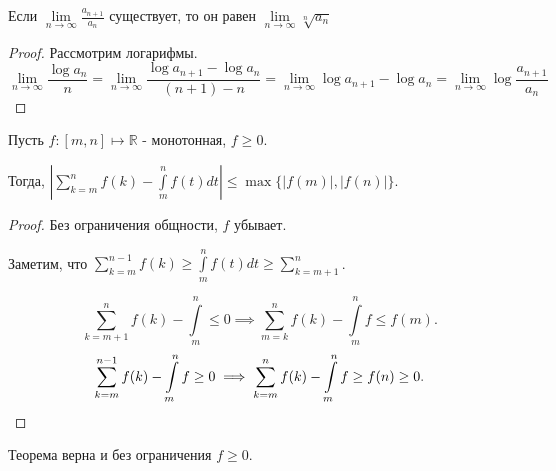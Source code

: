 \begin{theorem} \thmslashn

    Если $\lim\limits_{n \to \infty} \frac{a_{n+1}}{a_{n}}$ существует, то он равен $\lim\limits_{n \to \infty} \sqrt[n]{a_{n}} $
    \begin{proof} \thmslashn
    
        Рассмотрим логарифмы.
        \[ \lim\limits_{n \to \infty} \frac{\log a_{n}}{n} = \lim\limits_{n \to \infty} \frac{\log a_{n+1} - \log a_{n}}{(n+1) - n} = \lim\limits_{n \to \infty} \log a_{n+1} - \log a_{n} = \lim\limits_{n \to \infty} \log \frac{a_{n+1}}{a_{n}}\]
    \end{proof}
\end{theorem}
\begin{theorem} \thmslashn

    Пусть $f : [m, n] \mapsto \mathbb{R}$ - монотонная, $f \ge 0$.

    Тогда, $\left|\sum\limits_{k=m}^{n} f(k) - \int\limits_{m}^{n} f(t)dt\right| \le\max \{|f(m)|, |f(n)|\} $.

    \begin{proof} \thmslashn
        Без ограничения общности, $f$ убывает.
    
        Заметим, что $\sum\limits_{k=m}^{n-1} f(k) \ge \int\limits_{m}^{n} f(t)dt \ge \sum\limits_{k=m+1}^{n}$.

        \[ \sum\limits_{k=m+1}^{n} f(k) - \int\limits_{m}^{n} \le  0 \implies \sum\limits_{m=k}^{n} f(k) - \int\limits_{m}^{n} f \le f(m)   .\]
        \[ \sum\limits_{k=m}^{n-1} f(k) - \int\limits_{m}^{n} f \ge 0 \implies \sum\limits_{k=m}^{n} f(k) - \int\limits_{m}^{n} f \ge f(n) \ge 0  .\qedhere\]
    \end{proof}
\end{theorem}
\begin{remark} \thmslashn

    Теорема верна и без ограничения $f \ge 0$.
\end{remark}
